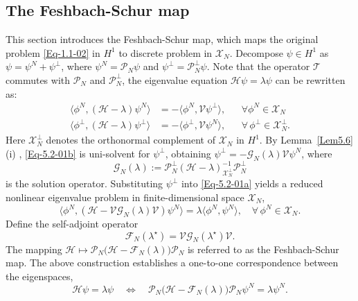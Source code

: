 \documentclass{sn-jnl}%
\numberwithin{equation}{section}
\theoremstyle{thmstyleone}%
\theoremstyle{thmstyletwo}%
\theoremstyle{thmstylethree}%
\begin{document}
\subsection{The Feshbach-Schur map}
\label{subsec:proofFM-2}
This section introduces the Feshbach-Schur map, which maps the original problem \eqref{Eq-1.1-02} in $H^1$ to discrete problem in $\mathscr{X}_N$. 
Decompose $\psi \in H^1$ as $\psi = \psi^N + \psi^\perp$, where $\psi^N =\mathcal{P}_N\psi$ and $\psi^\perp =\mathcal{P}^{\perp}_N\psi$. Note that the operator $\mathcal{T}$ commutes with $\mathcal{P}_N$ and $\mathcal{P}_N^\perp$, the eigenvalue equation $\mathcal{H}\psi=\lambda\psi$ can be rewritten as: 
\begin{subequations}
\begin{align}
\label{Eq-5.2-01a}
    \langle \phi^N, (\mathcal{H}-\lambda)\psi^N\rangle  
&= -\langle \phi^N, \mathcal{V}\psi^\perp\rangle,
&&\forall\phi^N\in \mathscr{X}_N
\\
\label{Eq-5.2-01b}
\langle \phi^\perp, (\mathcal{H}-\lambda)\psi^\perp\rangle 
&= -\langle \phi^\perp, \mathcal{V}\psi^N\rangle , 
&&\forall\,\phi^\perp\in \mathscr{X}^\perp_N.
\end{align}
\end{subequations}
Here $\mathscr{X}_N^\perp$ denotes the orthonormal complement of $\mathscr{X}_N$ in $H^1$.
By Lemma~\ref{Lem5.6} (i) , \eqref{Eq-5.2-01b} is uni-solvent for $\psi^\perp$, obtaining $\psi^\perp =-\mathcal{G}_N(\lambda) \mathcal{V} \psi^N$, where 
\[\mathcal{G}_N(\lambda):= \mathcal{P}_N^\perp(\mathcal{H}-\lambda)^{-1}_{\mathscr{X}_N^\perp}\mathcal{P}_N^\perp\]
is the solution operator.
Substituting $\psi^\perp$ into \eqref{Eq-5.2-01a} yields a reduced nonlinear eigenvalue problem in finite-dimensional space $\mathscr{X}_N$,
\begin{equation} 
\label{Eq-5.2-02}
    \langle \phi^N, \left(\mathcal{H}- \mathcal{V}\mathcal{G}_N(\lambda)\mathcal{V}\right)\psi^N \rangle  = \lambda \langle \phi^N, \psi^N\rangle,\quad \forall\,\phi^N\in \mathscr{X}_N.
\end{equation}
Define the self-adjoint operator
\[
\mathcal{F}_N(\lambda^{\star} ) = \mathcal{V} \mathcal{G}_N(\lambda^{\star}) \mathcal{V}.
\] 
The mapping $\mathcal{H}\mapsto \mathcal{P}_N\bigl(\mathcal{H}-\mathcal{F}_N(\lambda)\bigr)\mathcal{P}_N$ is referred to as the Feshbach-Schur map. The above construction establishes a one-to-one correspondence between the eigenspaces,
\[
    \mathcal{H}\psi = \lambda\psi \quad 
    \Longleftrightarrow \quad
    \mathcal{P}_N\bigl(\mathcal{H}-\mathcal{F}_{N}(\lambda)\bigr)\mathcal{P}_N\psi^N = \lambda\psi^N.
\]
\end{document}

